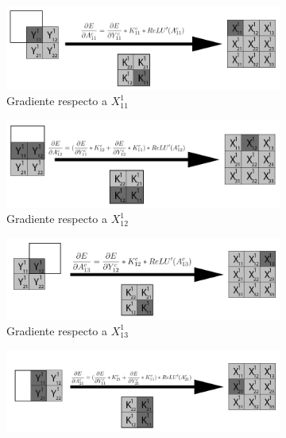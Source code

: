 \begin{figure}[H]
	\centering
	\begin{subfigure}{.5\textwidth}
		\hspace{-25mm}
		\includegraphics[width=1.4\linewidth]{imagenes/conv_back_entrada_1.jpg}  
		\caption{Gradiente respecto a $X^1_{11}$}
	\end{subfigure}%
	\begin{subfigure}{.5\textwidth}
		\hspace{5mm}
		\includegraphics[width=1.4\linewidth]{imagenes/conv_back_entrada_2.jpg}  
		\caption{Gradiente respecto a $X^1_{12}$}
	\end{subfigure}
	\vspace{5mm}
	\begin{subfigure}{.5\textwidth}
		\hspace{-25mm}
		\includegraphics[width=1.4\linewidth]{imagenes/conv_back_entrada_3.jpg}  
		\caption{Gradiente respecto a $X^1_{13}$}
	\end{subfigure}%
	\begin{subfigure}{.5\textwidth}
		\hspace{5mm}
		\includegraphics[width=1.4\linewidth]{imagenes/conv_back_entrada_4.jpg}  

\end{subfigure}
\end{figure}
